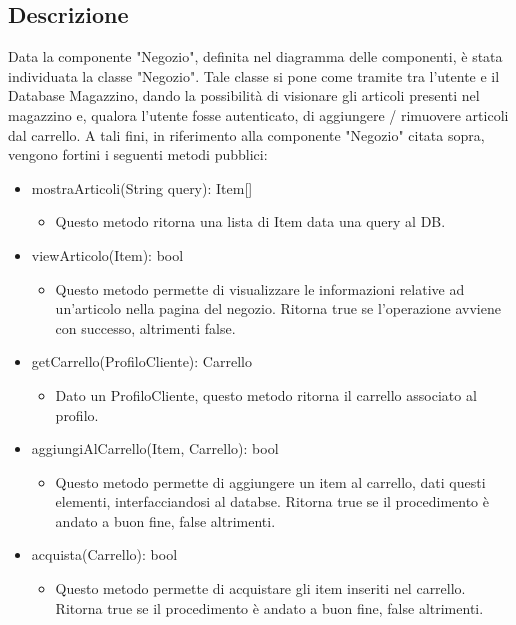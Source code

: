 \documentclass{report}
\begin{document}
\subsection*{Descrizione}

Data la componente "Negozio", definita nel diagramma delle componenti, è stata individuata la classe "Negozio". Tale classe si pone come tramite tra l'utente e il Database Magazzino, dando la possibilità di visionare gli articoli presenti nel magazzino e, qualora l'utente fosse autenticato, di aggiungere / rimuovere articoli dal carrello. A tali fini, in riferimento alla componente "Negozio" citata sopra, vengono fortini  i seguenti metodi pubblici:

\begin{itemize}

\item mostraArticoli(String query): Item[]
\begin{itemize}
	\item Questo metodo ritorna una lista di Item data una query al DB. 
\end{itemize}

\item viewArticolo(Item): bool
\begin{itemize}
	\item Questo metodo permette di visualizzare le informazioni relative ad un'articolo nella pagina del negozio. Ritorna true se l'operazione avviene con successo, altrimenti false.
\end{itemize}


\item getCarrello(ProfiloCliente): Carrello
\begin{itemize}
	\item Dato un ProfiloCliente, questo metodo ritorna il carrello associato al profilo.
\end{itemize}


\item aggiungiAlCarrello(Item, Carrello): bool
\begin{itemize}
	\item Questo metodo permette di aggiungere un item al carrello, dati questi elementi, interfacciandosi al databse. Ritorna true se il procedimento è andato a buon fine, false altrimenti.
\end{itemize}


\item acquista(Carrello): bool
\begin{itemize}
	\item Questo metodo permette di acquistare gli item inseriti nel carrello. Ritorna true se il procedimento è andato a buon fine, false altrimenti.
\end{itemize}

\end{itemize}
\end{document}
